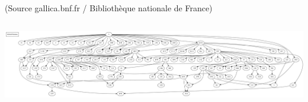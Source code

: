 \documentclass[10pt]{beamer}
\begin{document}
\begin{frame}
\begin{columns}
\begin{column}{0.45\textwidth}
\begin{overlayarea}{\textwidth}{0.5\textheight}
{						\tiny (Source gallica.bnf.fr / Bibliothèque nationale de France)
					}
				\end{overlayarea}
			\end{column}
		\end{columns}
		\begin{center}
			\includegraphics[width=\textwidth]{../img/global-stemma-complete.pdf}
		\end{center}	
	\end{frame}
\end{document}
